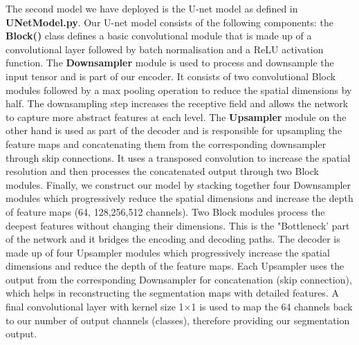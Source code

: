 The second model we have deployed is the U-net model as defined in \textbf{UNetModel.py}. Our U-net model consists of the following components: the \textbf{Block()} class defines a basic convolutional module that is made up of a convolutional layer followed by batch normalisation and a ReLU activation function. The \textbf{Downsampler} module is used to process and downsample the input tensor and is part of our encoder. It consists of two convolutional Block modules followed by a max pooling operation to reduce the spatial dimensions by half. The downsampling step increases the receptive field and allows the network to capture more abstract features at each level. The \textbf{Upsampler} module on the other hand is used as part of the decoder and is responsible for upsampling the feature maps and concatenating them from the corresponding downsampler through skip connections. It uses a transposed convolution to increase the spatial resolution and then processes the concatenated output through two Block modules. Finally, we construct our model by stacking together four Downsampler modules which progressively reduce the spatial dimensions and increase the depth of feature maps (64, 128,256,512 channels). Two Block modules process the deepest features without changing their dimensions. This is the "Bottleneck' part of the network and it bridges the encoding and decoding paths. The decoder is made up of four Upsampler modules which progressively increase the spatial dimensions and reduce the depth of the feature maps. Each Upsampler uses the output from the corresponding Downsampler for concatenation (skip connection), which helps in reconstructing the segmentation maps with detailed features. A final convolutional layer with kernel size 1$\times$1 is used to map the 64 channels back to our number of output channels (classes), therefore providing our segmentation output. 

